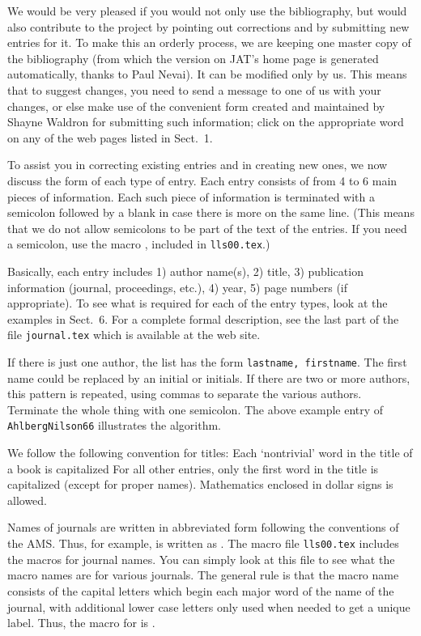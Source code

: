 We would be very pleased if you would not only use
the bibliography, but would also contribute to the project
by pointing out corrections and by submitting new entries
for it.  To make this an orderly process, we are keeping
one master copy of the bibliography (from which the version on JAT's home
page is generated automatically, thanks to Paul Nevai).
It can be modified only by us. This means that to
suggest changes, you need to send a message to one of us
with your changes, or else make use of the convenient form created and
maintained by Shayne Waldron for submitting such information;
click on the appropriate word on any of the web pages listed in
Sect.~1.

To assist you in correcting existing entries and in
creating new ones, we now discuss the form
of each type of entry.	Each entry consists of from 4 to 6
main pieces of information.  Each such piece of information
is terminated with a semicolon followed by a blank in case there
is more on the same line.  (This means that we
do not allow semicolons to be part of the text of the entries.
If you need a semicolon, use the macro , included in
{\tt lls00.tex}.)

Basically, each entry includes 1) author name(s), 2) title,
3) publication information (journal, proceedings, etc.),
4) year, 5) page numbers (if appropriate).  To see what
is required for each of the entry types, look at the
examples in Sect.~6. For a complete formal description, see the last part
of the file {\tt journal.tex} which is available at the web site.

\ms
{} If there is just one author,	the list
has the form {\tt lastname, firstname}.
The first name could be replaced by  an initial or initials.
If there are two or more authors,
this pattern is repeated, using commas to separate the
various authors. Terminate the whole thing with one semicolon.
The above example entry of {\tt AhlbergNilson66} illustrates
the algorithm.
\bs

 We follow the following convention for titles:
\sm
{} Each `nontrivial' word in the title of a book is capitalized
\sm
{} For all other entries, only the first word in
the title is capitalized (except for proper names).
\sm
{} Mathematics enclosed in dollar signs is allowed.
\bs

 Names of journals are written in abbreviated
form following the conventions of the AMS. Thus, for example,
 is written as .
The macro file {\tt lls00.tex} includes the macros for journal
names. You can simply look at this
file to see what the macro names are for various journals.
The general rule is that the macro name consists of the
capital letters which begin each major word of the name of the journal, with
additional lower case letters only used when needed to get a unique label.
Thus, the macro for  is .
\bs

